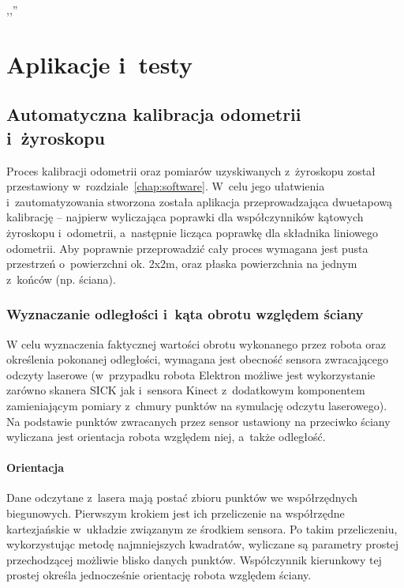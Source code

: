

\begin{savequote}[70mm]
,,''
\qauthor{}
\end{savequote}


\chapter{Aplikacje i~testy}
\label{chap:aplikacje}

\section{Automatyczna kalibracja odometrii i~żyroskopu}

Proces kalibracji odometrii oraz pomiarów uzyskiwanych z~żyroskopu został
przestawiony w~rozdziale~\ref{chap:software}. W~celu jego ułatwienia 
i~zautomatyzowania stworzona została aplikacja przeprowadzająca dwuetapową
kalibrację -- najpierw wyliczająca poprawki dla współczynników kątowych
żyroskopu i~odometrii, a~następnie licząca poprawkę dla składnika liniowego
odometrii. Aby poprawnie przeprowadzić cały proces wymagana jest pusta
przestrzeń o~powierzchni ok. 2x2m, oraz płaska powierzchnia na jednym z~końców
(np. ściana).

\subsection{Wyznaczanie odległości i~kąta obrotu względem ściany}

W celu wyznaczenia faktycznej wartości obrotu wykonanego przez robota oraz
określenia pokonanej odległości, wymagana jest obecność sensora zwracającego
odczyty laserowe (w~przypadku robota Elektron możliwe jest wykorzystanie
zarówno skanera SICK jak i~sensora Kinect z~dodatkowym komponentem
zamieniającym pomiary z~chmury punktów na symulację odczytu laserowego). Na
podstawie punktów zwracanych przez sensor ustawiony na przeciwko ściany
wyliczana jest orientacja robota względem niej, a~także odległość.

\subsubsection{Orientacja}

Dane odczytane z~lasera mają postać zbioru punktów we współrzędnych biegunowych.
Pierwszym krokiem jest ich przeliczenie na współrzędne kartezjańskie w~układzie
związanym ze środkiem sensora. Po takim przeliczeniu, wykorzystując metodę
najmniejszych kwadratów, wyliczane są parametry prostej przechodzącej możliwie
blisko danych punktów. Współczynnik kierunkowy tej prostej określa jednocześnie
orientację robota względem ściany.

